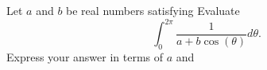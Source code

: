 Let $a$ and $b$ be real numbers satisfying   Evaluate \[\int_0^{2\pi}\dfrac{1}{a+b\cos(\theta)}d\theta.\]  Express your answer in terms of $a$ and 